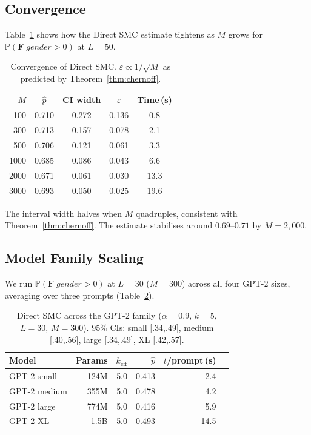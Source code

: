 \documentclass{article}
\newcommand{\Prob}{\mathbb{P}}
\newcommand{\eps}{\varepsilon}
\begin{document}
\subsection{Convergence}

Table~\ref{tab:convergence} shows how the Direct SMC estimate tightens as
$M$ grows for $\Prob(\mathbf{F}\;\textit{gender}{>}0)$ at $L{=}50$.

\begin{table}[tb]
\centering
\small
\caption{Convergence of Direct SMC.
$\eps \propto 1/\sqrt{M}$ as predicted by Theorem~\ref{thm:chernoff}.}
\label{tab:convergence}
\begin{tabular}{rcccc}
\toprule
$M$ & $\hat{p}$ & CI width & $\eps$ & Time\,(s) \\
\midrule
100   & 0.710 & 0.272 & 0.136 &  0.8 \\
300   & 0.713 & 0.157 & 0.078 &  2.1 \\
500   & 0.706 & 0.121 & 0.061 &  3.3 \\
1000  & 0.685 & 0.086 & 0.043 &  6.6 \\
2000  & 0.671 & 0.061 & 0.030 & 13.3 \\
3000  & 0.693 & 0.050 & 0.025 & 19.6 \\
\bottomrule
\end{tabular}
\end{table}

The interval width halves when $M$ quadruples, consistent with
Theorem~\ref{thm:chernoff}.
The estimate stabilises around $0.69$--$0.71$ by $M{=}2{,}000$.

\subsection{Model Family Scaling}
\label{sec:model-scaling}

We run $\Prob(\mathbf{F}\;\textit{gender}{>}0)$ at $L{=}30$ ($M{=}300$) across
all four GPT-2 sizes, averaging over three prompts
(Table~\ref{tab:model-scaling}).

\begin{table}[tb]
\centering
\small
\caption{Direct SMC across the GPT-2 family ($\alpha{=}0.9$, $k{=}5$,
$L{=}30$, $M{=}300$). 95\% CIs: small [.34,.49], medium [.40,.56],
large [.34,.49], XL [.42,.57].}
\label{tab:model-scaling}
\begin{tabular}{lrrrrr}
\toprule
Model & Params & $k_\text{eff}$ & $\hat{p}$ & $t$/prompt\,(s) \\
\midrule
GPT-2 small  & 124M & 5.0 & 0.413 &  2.4 \\
GPT-2 medium & 355M & 5.0 & 0.478 &  4.2 \\
GPT-2 large  & 774M & 5.0 & 0.416 &  5.9 \\
GPT-2 XL     & 1.5B & 5.0 & 0.493 & 14.5 \\
\bottomrule
\end{tabular}
\end{table}
\end{document}
